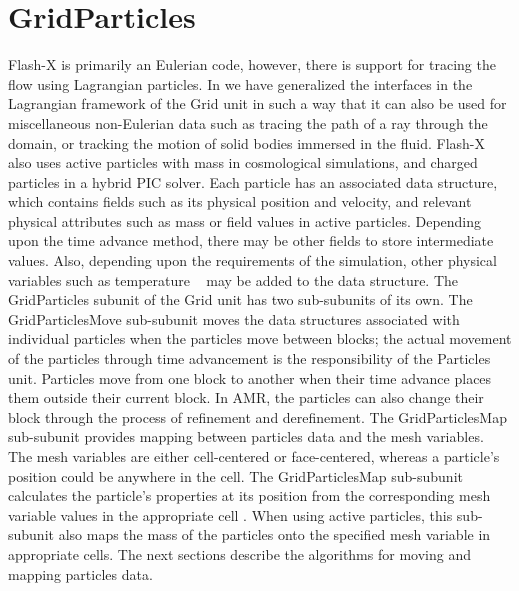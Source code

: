 
\section{\unit{GridParticles}}
\label{Sec:GridParticles}

Flash-X is primarily an Eulerian code, however, there is support for
tracing the flow using Lagrangian particles. In \flashx we have
generalized the interfaces in the Lagrangian framework of the Grid
unit in such a way that it can also be used for miscellaneous 
non-Eulerian data such as tracing the path of a ray through the domain, 
or tracking the motion of solid bodies immersed in the fluid. Flash-X also
uses active particles with mass in cosmological simulations, and
charged particles in a hybrid PIC solver. Each particle has an
associated data structure, which contains fields such as its physical
position and velocity, and relevant physical attributes such as mass
or field values in active  particles. Depending upon the time advance
method, there may be other fields to store intermediate values. Also,
depending upon the requirements of the simulation, other physical variables
such as temperature \etc~ may be added to the data structure.
The \unit{GridParticles} subunit of the \unit{Grid} unit has two
sub-subunits of its own. The \unit{GridParticlesMove} sub-subunit 
moves the data structures associated with individual particles when
the particles move between blocks; the actual movement of the
particles through time advancement is the responsibility of the
\unit{Particles} unit. Particles move from one block to another
when their time advance places them outside their current
block. In AMR, the particles can also change their block through the
process of refinement and derefinement. The \unit{GridParticlesMap}
sub-subunit provides mapping between particles data and the mesh
variables. The mesh variables are either cell-centered or
face-centered, whereas a particle's position could be anywhere in the
cell. The \unit{GridParticlesMap} sub-subunit calculates the particle's
properties at its position from the corresponding mesh variable values
in the appropriate cell . When using active particles, this sub-subunit
also maps the mass of the particles onto the specified mesh variable
in appropriate cells.   The next sections describe the
algorithms for moving and mapping particles data.


